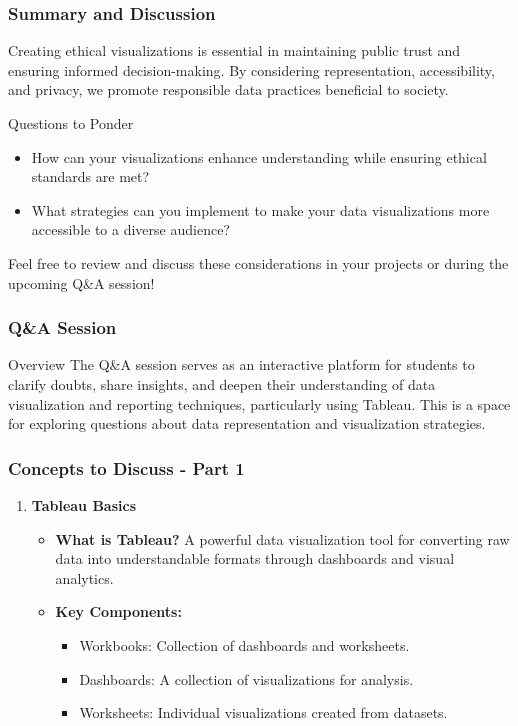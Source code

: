 \documentclass[aspectratio=169]{beamer}
\begin{document}
\begin{frame}[fragile]
    \frametitle{Summary and Discussion}
    
    Creating ethical visualizations is essential in maintaining public trust and ensuring informed decision-making. By considering representation, accessibility, and privacy, we promote responsible data practices beneficial to society.
    
    \begin{block}{Questions to Ponder}
        \begin{itemize}
            \item How can your visualizations enhance understanding while ensuring ethical standards are met?
            \item What strategies can you implement to make your data visualizations more accessible to a diverse audience?
        \end{itemize}
    \end{block}
    
    Feel free to review and discuss these considerations in your projects or during the upcoming Q\&A session!
\end{frame}

\begin{frame}[fragile]
    \frametitle{Q\&A Session}
    \begin{block}{Overview}
        The Q\&A session serves as an interactive platform for students to clarify doubts, share insights, and deepen their understanding of data visualization and reporting techniques, particularly using Tableau. This is a space for exploring questions about data representation and visualization strategies.
    \end{block}
\end{frame}

\begin{frame}[fragile]
    \frametitle{Concepts to Discuss - Part 1}
    \begin{enumerate}
        \item \textbf{Tableau Basics}
            \begin{itemize}
                \item \textbf{What is Tableau?} A powerful data visualization tool for converting raw data into understandable formats through dashboards and visual analytics.
                \item \textbf{Key Components:}
                    \begin{itemize}
                        \item Workbooks: Collection of dashboards and worksheets.
                        \item Dashboards: A collection of visualizations for analysis.
                        \item Worksheets: Individual visualizations created from datasets.
                    \end{itemize}
            \end{itemize}
    \end{enumerate}
\end{frame}
\end{document}
